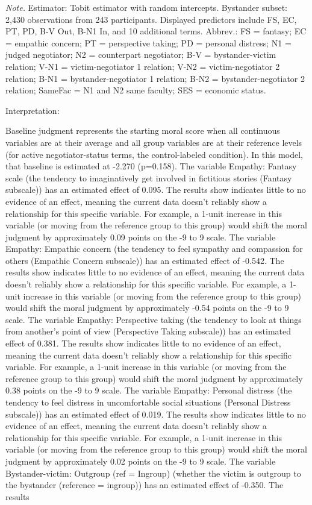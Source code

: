 \documentclass[11pt]{article}
\begin{document}
\begin{flushleft}
\footnotesize\textit{Note.} Estimator: Tobit estimator with random intercepts. Bystander subset: 2,430 observations from 243 participants. Displayed predictors include FS, EC, PT, PD, B-V Out, B-N1 In, and 10 additional terms. Abbrev.: FS = fantasy; EC = empathic concern; PT = perspective taking; PD = personal distress; N1 = judged negotiator; N2 = counterpart negotiator; B-V = bystander-victim relation; V-N1 = victim-negotiator 1 relation; V-N2 = victim-negotiator 2 relation; B-N1 = bystander-negotiator 1 relation; B-N2 = bystander-negotiator 2 relation; SameFac = N1 and N2 same faculty; SES = economic status.
\end{flushleft}

Interpretation:

Baseline judgment represents the starting moral score when all continuous variables are at their average and all group variables are at their reference levels (for active negotiator-status terms, the control-labeled condition). In this model, that baseline is estimated at -2.270 (p=0.158). The variable Empathy: Fantasy scale (the tendency to imaginatively get involved in fictitious stories (Fantasy subscale)) has an estimated effect of 0.095. The results show indicates little to no evidence of an effect, meaning the current data doesn't reliably show a relationship for this specific variable. For example, a 1-unit increase in this variable (or moving from the reference group to this group) would shift the moral judgment by approximately 0.09 points on the -9 to 9 scale. The variable Empathy: Empathic concern (the tendency to feel sympathy and compassion for others (Empathic Concern subscale)) has an estimated effect of -0.542. The results show indicates little to no evidence of an effect, meaning the current data doesn't reliably show a relationship for this specific variable. For example, a 1-unit increase in this variable (or moving from the reference group to this group) would shift the moral judgment by approximately -0.54 points on the -9 to 9 scale. The variable Empathy: Perspective taking (the tendency to look at things from another's point of view (Perspective Taking subscale)) has an estimated effect of 0.381. The results show indicates little to no evidence of an effect, meaning the current data doesn't reliably show a relationship for this specific variable. For example, a 1-unit increase in this variable (or moving from the reference group to this group) would shift the moral judgment by approximately 0.38 points on the -9 to 9 scale. The variable Empathy: Personal distress (the tendency to feel distress in uncomfortable social situations (Personal Distress subscale)) has an estimated effect of 0.019. The results show indicates little to no evidence of an effect, meaning the current data doesn't reliably show a relationship for this specific variable. For example, a 1-unit increase in this variable (or moving from the reference group to this group) would shift the moral judgment by approximately 0.02 points on the -9 to 9 scale. The variable Bystander-victim: Outgroup (ref = Ingroup) (whether the victim is outgroup to the bystander (reference = ingroup)) has an estimated effect of -0.350. The results 
\end{document}
